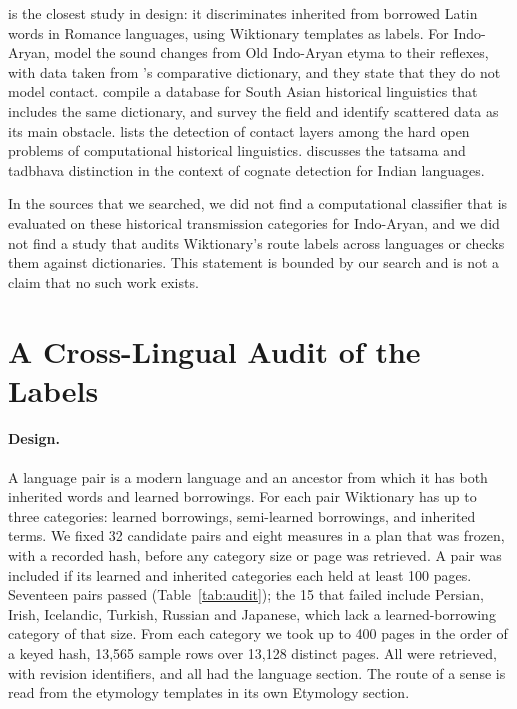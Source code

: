 \documentclass[11pt]{article}
\begin{document}
\citet{cristea2021inherited} is the closest study in design: it discriminates inherited from borrowed Latin words in Romance languages, using Wiktionary templates as labels. For Indo-Aryan, \citet{cathcart2020disentangling} model the sound changes from Old Indo-Aryan etyma to their reflexes, with data taken from \citeauthor{turner1966cdial}'s comparative dictionary, and they state that they do not model contact. \citet{arora2023jambu} compile a database for South Asian historical linguistics that includes the same dictionary, and \citet{arora2022computational} survey the field and identify scattered data as its main obstacle. \citet{list2024openproblems} lists the detection of contact layers among the hard open problems of computational historical linguistics. \citet[\S4.1]{kanojia2021thesis} discusses the tatsama and tadbhava distinction in the context of cognate detection for Indian languages.

In the sources that we searched, we did not find a computational classifier that is evaluated on these historical transmission categories for Indo-Aryan, and we did not find a study that audits Wiktionary's route labels across languages or checks them against dictionaries. This statement is bounded by our search and is not a claim that no such work exists.

\section{A Cross-Lingual Audit of the Labels}
\label{sec:audit}

\paragraph{Design.} A language pair is a modern language and an ancestor from which it has both inherited words and learned borrowings. For each pair Wiktionary has up to three categories: learned borrowings, semi-learned borrowings, and inherited terms. We fixed 32 candidate pairs and eight measures in a plan that was frozen, with a recorded hash, before any category size or page was retrieved. A pair was included if its learned and inherited categories each held at least 100 pages. Seventeen pairs passed (Table~\ref{tab:audit}); the 15 that failed include Persian, Irish, Icelandic, Turkish, Russian and Japanese, which lack a learned-borrowing category of that size. From each category we took up to 400 pages in the order of a keyed hash, 13,565 sample rows over 13,128 distinct pages. All were retrieved, with revision identifiers, and all had the language section. The route of a sense is read from the etymology templates in its own Etymology section.
\end{document}
